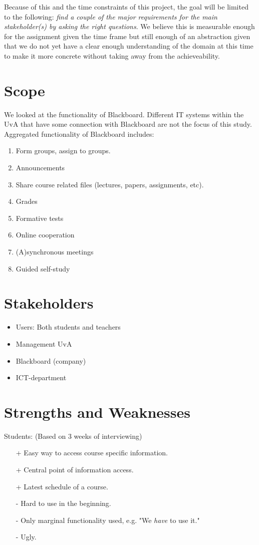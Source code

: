 Because of this and the time constraints of this project, the goal will be limited to the following: \emph{find a couple of the major requirements for the main stakeholder(s) by asking the right questions}. We believe this is measurable enough for the assignment given the time frame but still enough of an abstraction given that we do not yet have a clear enough understanding of the domain at this time to make it more concrete without taking away from the achieveability.

\section{Scope}
We looked at the functionality of Blackboard. Different IT systems within the UvA that have some connection with Blackboard are not the focus of this study. Aggregated functionality of Blackboard includes:
\begin{enumerate}
	\item Form groups, assign to groups.
	\item Announcements
	\item Share course related files (lectures, papers, assignments, etc).
	\item Grades
	\item Formative tests
	\item Online cooperation
	\item (A)synchronous meetings
	\item Guided self-study
\end{enumerate}


\section{Stakeholders}
\begin{itemize}
	\item Users: Both students and teachers
	\item Management UvA
	\item Blackboard (company)
	\item ICT-department
\end{itemize}

\section{Strengths and Weaknesses}
Students: (Based on 3 weeks of interviewing)
\begin{itemize}
	\item[+] Easy way to access course specific information.
	\item[+] Central point of information access.
	\item[+] Latest schedule of a course.
	\item[-] Hard to use in the beginning.
	\item[-] Only marginal functionality used, e.g. "We \textit{have} to use it."
	\item[-] Ugly.
\end{itemize}

